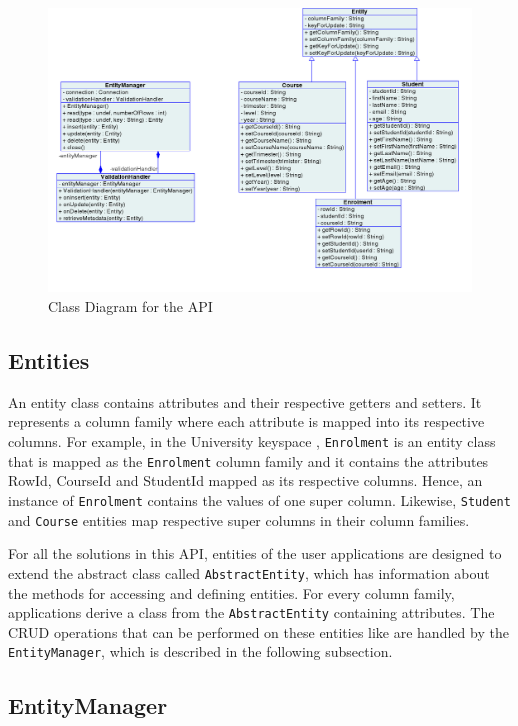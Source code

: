 \begin{figure}[h] 
	\centering
	\includegraphics[width=\textwidth]{./figure/Solutions/FinalClassDiagram.png}
	\caption{Class Diagram for the \ac{API}}\label{f:classDiagram}
\end{figure}


	\subsection{Entities} 
	An entity class contains attributes and their respective  getters and setters.
	 It represents a column family where each attribute is mapped into its
	 respective columns.  For example,  in the University keyspace , 
	\texttt{Enrolment} is an entity class that is mapped as the
	\texttt{Enrolment} column family and it contains the attributes RowId,
	CourseId and StudentId  mapped as its respective columns. Hence, an instance of
	\texttt{Enrolment} contains the values of one super column. Likewise, 
	\texttt{Student} and \texttt{Course} entities  map respective super columns in
	their column families.

	For all the solutions in this \ac{API},  entities of the user applications are
	designed to extend the abstract class called \texttt{AbstractEntity},  which has
	information about the  methods for accessing and defining  entities.  For
	every column family, applications derive a class from the
	\texttt{AbstractEntity} containing attributes.
	The \ac{CRUD} operations that can be performed on these entities like   are
	handled by the \texttt{EntityManager},  which is described in the following
	subsection.
		
	\subsection{EntityManager}

